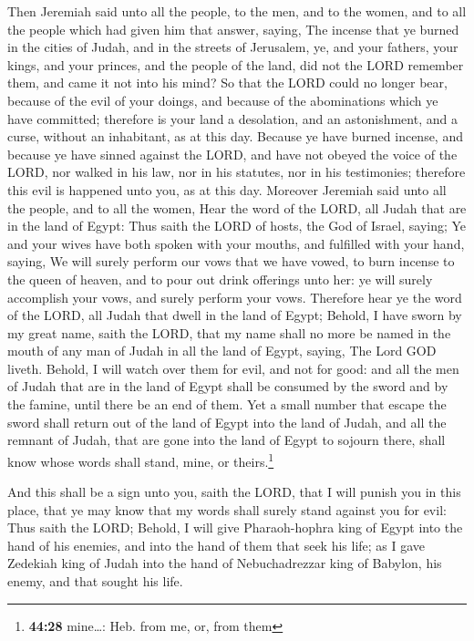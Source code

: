  Then Jeremiah said unto all the people, to the men, and
to the women, and to all the people which had given him that answer,
saying,  The incense that ye burned in the cities of
Judah, and in the streets of Jerusalem, ye, and your fathers, your
kings, and your princes, and the people of the land, did not the LORD
remember them, and came it not into his mind?  So that
the LORD could no longer bear, because of the evil of your doings, and
because of the abominations which ye have committed; therefore is your
land a desolation, and an astonishment, and a curse, without an
inhabitant, as at this day.  Because ye have burned
incense, and because ye have sinned against the LORD, and have not
obeyed the voice of the LORD, nor walked in his law, nor in his
statutes, nor in his testimonies; therefore this evil is happened unto
you, as at this day.  Moreover Jeremiah said unto all the
people, and to all the women, Hear the word of the LORD, all Judah that
are in the land of Egypt:  Thus saith the LORD of hosts,
the God of Israel, saying; Ye and your wives have both spoken with your
mouths, and fulfilled with your hand, saying, We will surely perform our
vows that we have vowed, to burn incense to the queen of heaven, and to
pour out drink offerings unto her: ye will surely accomplish your vows,
and surely perform your vows.  Therefore hear ye the word
of the LORD, all Judah that dwell in the land of Egypt; Behold, I have
sworn by my great name, saith the LORD, that my name shall no more be
named in the mouth of any man of Judah in all the land of Egypt, saying,
The Lord GOD liveth.  Behold, I will watch over them for
evil, and not for good: and all the men of Judah that are in the land of
Egypt shall be consumed by the sword and by the famine, until there be
an end of them.  Yet a small number that escape the sword
shall return out of the land of Egypt into the land of Judah, and all
the remnant of Judah, that are gone into the land of Egypt to sojourn
there, shall know whose words shall stand, mine, or theirs.\footnote{\textbf{44:28}
  mine\ldots: Heb. from me, or, from them}

 And this shall be a sign unto you, saith the LORD, that
I will punish you in this place, that ye may know that my words shall
surely stand against you for evil:  Thus saith the LORD;
Behold, I will give Pharaoh-hophra king of Egypt into the hand of his
enemies, and into the hand of them that seek his life; as I gave
Zedekiah king of Judah into the hand of Nebuchadrezzar king of Babylon,
his enemy, and that sought his life.

